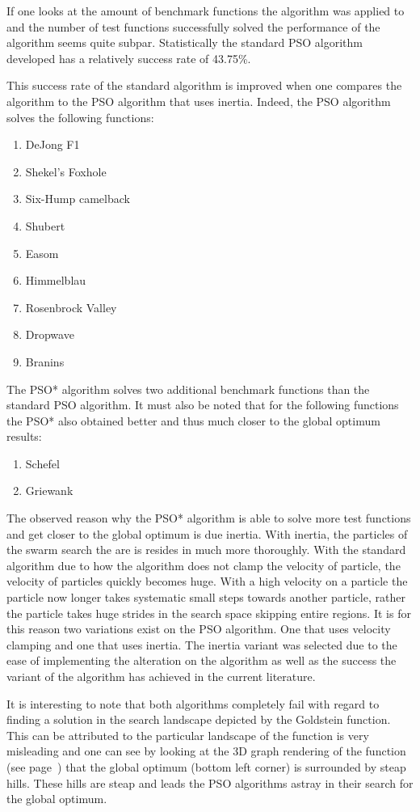 If one looks at the amount of benchmark functions the algorithm was applied to and the number of test functions successfully solved the performance of the algorithm seems quite subpar. Statistically the standard PSO algorithm developed has a relatively success rate of 43.75\%.

This success rate of the standard algorithm is improved when one compares the algorithm to the PSO algorithm that uses inertia. Indeed, the PSO algorithm solves the following functions:
\begin{enumerate}
\item DeJong F1 
\item Shekel's Foxhole
\item Six-Hump camelback
\item Shubert
\item Easom
\item Himmelblau
\item Rosenbrock Valley
\item Dropwave
\item Branins
\end{enumerate}
The PSO* algorithm solves two additional benchmark functions than the standard PSO algorithm. It must also be noted that for the following functions the PSO* also obtained better and thus much closer to the global optimum results:
\begin{enumerate}
\item Schefel
\item Griewank
\end{enumerate}
The observed reason why the PSO* algorithm is able to solve more test functions and get closer to the global optimum is due inertia. With inertia, the particles of the swarm search the are is resides in much more thoroughly. With the standard algorithm due to how the algorithm does not clamp the velocity of particle, the velocity of particles quickly becomes huge. With a high velocity on a particle the particle now longer takes systematic small steps towards another particle, rather the particle takes huge strides in the search space skipping entire regions. It is for this reason two variations exist on the PSO algorithm. One that uses velocity clamping and one that uses inertia. The inertia variant was selected due to the ease of implementing the alteration on the algorithm as well as the success the variant of the algorithm has achieved in the current literature.

It is interesting to note that both algorithms completely fail with regard to finding a solution in the search landscape depicted by the Goldstein function. This can be attributed to the particular landscape of the function is very misleading and one can see by looking at the 3D graph rendering of the function (see page~\pageref{fig:GoldsteinGraph}) that the global optimum (bottom left corner) is surrounded by steap hills. These hills are steap and leads the PSO algorithms astray in their search for the global optimum.

